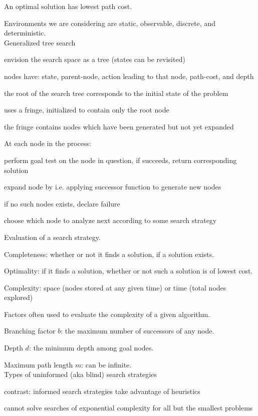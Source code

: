 \documentclass[12pt]{article}
\begin{document}
An optimal solution has lowest path cost.

\noindent
Environments we are considering are static, observable, discrete, and deterministic.\\

\noindent
Generalized tree search

envision the search space as a tree (states can be revisited)

nodes have: state, parent-node, action leading to that node, path-cost, and depth

the root of the search tree corresponds to the initial state of the problem

uses a fringe, initialized to contain only the root node

the fringe contains nodes which have been generated but not yet expanded

\noindent
At each node in the process:

perform goal test on the node in question, if succeeds, return corresponding solution

expand node by i.e. applying successor function to generate new nodes

if no such nodes exists, declare failure

choose which node to analyze next according to some search strategy

\noindent
Evaluation of a search strategy.

Completeness: whether or not it finds a solution, if a solution exists.

Optimality: if it finds a solution, whether or not such a solution is of lowest cost.

Complexity: space (nodes stored at any given time) or time (total nodes explored)

\noindent
Factors often used to evaluate the complexity of a given algorithm.

Branching factor $b$: the maximum number of successors of any node.

Depth $d$: the minimum depth among goal nodes.

Maximum path length $m$: can be infinite.\\

\noindent
Types of uninformed (aka blind) search strategies

contrast: informed search strategies take advantage of heuristics

cannot solve searches of exponential complexity for all but the smallest problems
\end{document}
